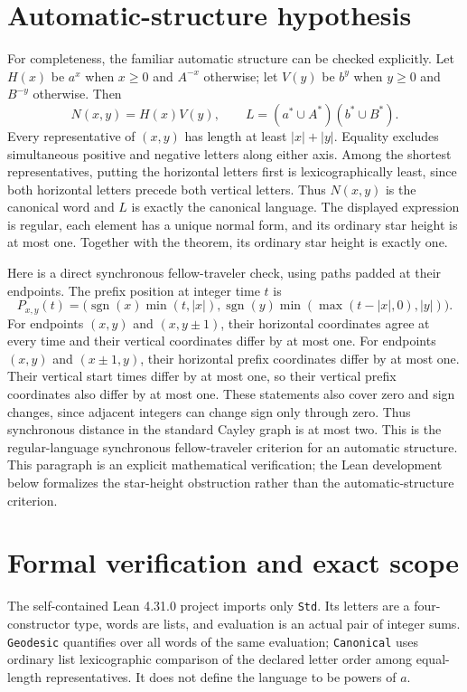 \documentclass[11pt]{article}
\begin{document}
\section{Automatic-structure hypothesis}
For completeness, the familiar automatic structure can be checked explicitly. Let $H(x)$ be $a^x$ when $x\geq0$ and $A^{-x}$ otherwise; let $V(y)$ be $b^y$ when $y\geq0$ and $B^{-y}$ otherwise. Then
\[
 N(x,y)=H(x)V(y), \qquad
 L=(a^*\cup A^*)(b^*\cup B^*).
\]
Every representative of $(x,y)$ has length at least $|x|+|y|$. Equality excludes simultaneous positive and negative letters along either axis. Among the shortest representatives, putting the horizontal letters first is lexicographically least, since both horizontal letters precede both vertical letters. Thus $N(x,y)$ is the canonical word and $L$ is exactly the canonical language. The displayed expression is regular, each element has a unique normal form, and its ordinary star height is at most one. Together with the theorem, its ordinary star height is exactly one.

Here is a direct synchronous fellow-traveler check, using paths padded at their endpoints. The prefix position at integer time $t$ is
\[
 P_{x,y}(t)=\bigl(\operatorname{sgn}(x)\min(t,|x|),
 \operatorname{sgn}(y)\min(\max(t-|x|,0),|y|)\bigr).
\]
For endpoints $(x,y)$ and $(x,y\pm1)$, their horizontal coordinates agree at every time and their vertical coordinates differ by at most one. For endpoints $(x,y)$ and $(x\pm1,y)$, their horizontal prefix coordinates differ by at most one. Their vertical start times differ by at most one, so their vertical prefix coordinates also differ by at most one. These statements also cover zero and sign changes, since adjacent integers can change sign only through zero. Thus synchronous distance in the standard Cayley graph is at most two. This is the regular-language synchronous fellow-traveler criterion for an automatic structure. This paragraph is an explicit mathematical verification; the Lean development below formalizes the star-height obstruction rather than the automatic-structure criterion.

\section{Formal verification and exact scope}
The self-contained Lean 4.31.0 project imports only \texttt{Std}. Its letters are a four-constructor type, words are lists, and evaluation is an actual pair of integer sums. \texttt{Geodesic} quantifies over all words of the same evaluation; \texttt{Canonical} uses ordinary list lexicographic comparison of the declared letter order among equal-length representatives. It does not define the language to be powers of $a$.
\end{document}
